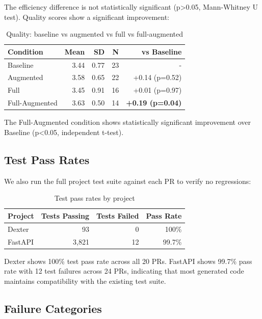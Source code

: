 \documentclass[sigconf,anonymous,review]{acmart}
\begin{document}
The efficiency difference is not statistically significant (p>0.05, Mann-Whitney U test). Quality scores show a significant improvement:

\begin{table}[ht]
  \centering
  \caption{Quality: baseline vs augmented vs full vs full-augmented}
  \label{tab:quality-stats}
  \begin{tabular}{lrrrr}
    \hline
    \textbf{Condition} & \textbf{Mean} & \textbf{SD} & \textbf{N} & \textbf{vs Baseline} \\
    \hline
    Baseline & 3.44 & 0.77 & 23 & - \\
    Augmented & 3.58 & 0.65 & 22 & +0.14 (p=0.52) \\
    Full & 3.45 & 0.91 & 16 & +0.01 (p=0.97) \\
    Full-Augmented & 3.63 & 0.50 & 14 & \textbf{+0.19 (p=0.04)} \\
    \hline
  \end{tabular}
\end{table}

The Full-Augmented condition shows statistically significant improvement over Baseline (p<0.05, independent t-test).

\subsection{Test Pass Rates}

We also run the full project test suite against each PR to verify no regressions:

\begin{table}[ht]
  \centering
  \caption{Test pass rates by project}
  \label{tab:test-pass-rates}
  \begin{tabular}{lrrr}
    \hline
    \textbf{Project} & \textbf{Tests Passing} & \textbf{Tests Failed} & \textbf{Pass Rate} \\
    \hline
    Dexter & 93 & 0 & 100\% \\
    FastAPI & 3,821 & 12 & 99.7\% \\
    \hline
  \end{tabular}
\end{table}

Dexter shows 100\% test pass rate across all 20 PRs. FastAPI shows 99.7\% pass rate with 12 test failures across 24 PRs, indicating that most generated code maintains compatibility with the existing test suite.

\subsection{Failure Categories}
\end{document}
